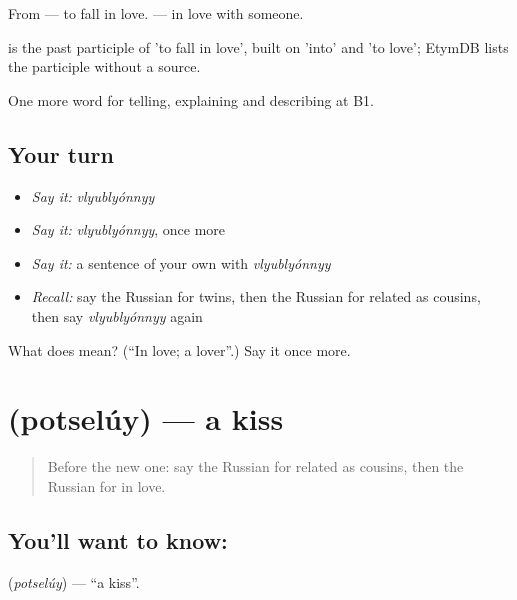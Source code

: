 From \emph{} — to fall in love. \emph{  } — in love with someone.

\begin{cousinweb}
\emph{} is the past participle of \emph{} 'to fall in love', built on \emph{} 'into' and \emph{} 'to love'; EtymDB lists the participle without a source.
\end{cousinweb}

\begin{grammarlens}[title={What you've built}]
One more word for telling, explaining and describing at B1.
\end{grammarlens}

\subsection*{Your turn}
\begin{itemize}
\raggedright
  \item \emph{Say it:} \emph{vlyublyónnyy}
  \item \emph{Say it:} \emph{vlyublyónnyy}, once more
  \item \emph{Say it:} a sentence of your own with \emph{vlyublyónnyy}
  \item \emph{Recall:} say the Russian for twins, then the Russian for related as cousins, then say \emph{vlyublyónnyy} again
\end{itemize}

\begin{tcolorbox}[breakable,colback=teal!4,colframe=teal!35!black,title={Before you move on}]
What does  mean? (\textquotedblleft{}In love; a lover\textquotedblright{}.) Say it once more.
\end{tcolorbox}
\section[\texorpdfstring{\ru{поцелуй} (potselúy)}{поцелуй (potselúy)}]{ (potselúy) — a kiss}

\label{lesson:RU-C493-potseluy}



\begin{quote}
Before the new one: say the Russian for related as cousins, then the Russian for in love.
\end{quote}

\subsection*{You'll want to know: }
\textbf{} (\emph{potselúy}) — \textquotedblleft{}a kiss\textquotedblright{}.

